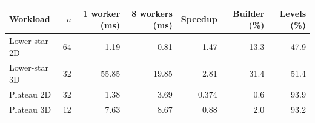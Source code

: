 \begin{tabular}{lrrrrrr}
\hline
Workload & $n$ & 1 worker (ms) & 8 workers (ms) & Speedup & Builder (\%) & Levels (\%) \\
\hline
Lower-star 2D & 64 & 1.19 & 0.81 & 1.47 & 13.3 & 47.9 \\
Lower-star 3D & 32 & 55.85 & 19.85 & 2.81 & 31.4 & 51.4 \\
Plateau 2D & 32 & 1.38 & 3.69 & 0.374 & 0.6 & 93.9 \\
Plateau 3D & 12 & 7.63 & 8.67 & 0.88 & 2.0 & 93.2 \\
\hline
\end{tabular}
